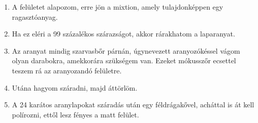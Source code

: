 \begin{enumerate}
	\item A felületet alapozom, erre jön a mixtion, amely tulajdonképpen egy ragasztóanyag. 
	\item Ha ez eléri a 99 százalékos szárazságot, akkor rárakhatom a laparanyat.
	\item Az aranyat mindig szarvasbőr párnán, úgynevezett aranyozókéssel vágom olyan darabokra, amekkorára szükségem van. Ezeket mókusszőr ecsettel teszem rá az aranyozandó felületre. 
	\item Utána hagyom száradni, majd áttörlöm.
	\item A 24 karátos aranylapokat száradás után egy féldrágakővel, acháttal is át kell polírozni, ettől lesz fényes a matt felület.
\end{enumerate}

